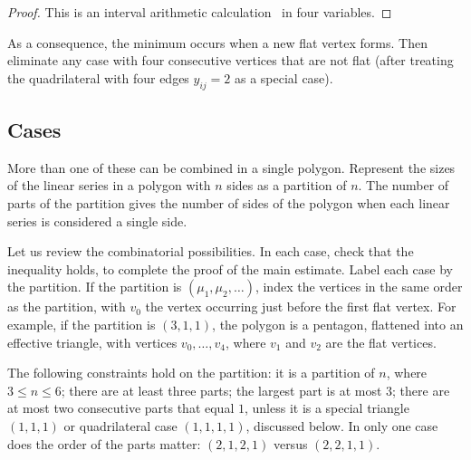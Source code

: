 {\begin{proof} This is an interval arithmetic calculation~\cite[cc:qua]{hales:2009:nonlinear} in four variables.%
\end{proof}

As a consequence, the minimum occurs when a new flat vertex forms.   Then eliminate any case with four consecutive vertices that are not flat (after treating the quadrilateral with four edges $y_{ij}=2$ as a special case).

\subsection{Cases}

More than one of these can be combined in a single polygon.   Represent the sizes of the linear series in a polygon with $n$ sides as a partition of $n$.
The number of parts of the partition gives the number of sides of the polygon when each linear series is considered a single side. 


Let us review the combinatorial possibilities.  In each case,  check that the inequality holds, to complete the proof of the main estimate.  Label each 
case by the partition.  If the partition is $(\mu_1,\mu_2,\ldots)$, 
index the vertices in the same order as the partition, with $v_0$
the vertex occurring just before the first flat vertex.  For example,
if the partition is $(3,1,1)$, the polygon is a pentagon, flattened into
an effective triangle, with vertices $v_0,\ldots,v_4$, where $v_1$ and $v_2$
are the flat vertices.

The following constraints hold on the partition: it is
a partition of $n$, where $3\le n\le 6$; there
are at least three parts; the largest part is at most $3$;  there are
at most two consecutive parts that equal $1$, unless it is a special triangle $(1,1,1)$ or
quadrilateral case $(1,1,1,1)$, discussed below.  In only one case
does the order of the parts matter: $(2,1,2,1)$ versus $(2,2,1,1)$.

}

